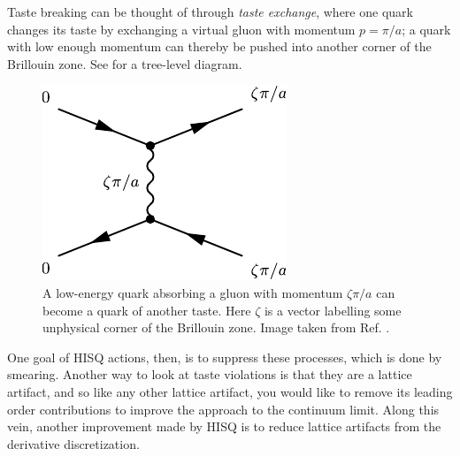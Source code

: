 Taste breaking can be thought of through {\it taste exchange}, where
one quark changes its taste by exchanging a virtual gluon with momentum
$p=\pi/a$; a quark with low enough momentum can thereby be pushed into
another corner of the Brillouin zone. See 
for a tree-level diagram.
\begin{figure}[t]
  \centering
  \includegraphics{figs/treelevel.pdf}
  \caption{A low-energy quark absorbing a gluon with momentum $\zeta\pi/a$
           can become a quark of another taste. Here $\zeta$ is a vector
           labelling some unphysical corner of the Brillouin zone. Image
           taken from Ref. \cite{follana_highly_2007}.
           }
  \label{fig:treeLevelTasteExchange}
\end{figure}
One goal of HISQ actions, then, is to suppress these processes, which is
done by smearing. Another way to look at taste violations is that they
are a lattice artifact, and so like any other lattice artifact, you would
like to remove its leading order contributions to improve the
approach to the continuum limit. Along this vein, another improvement
made by HISQ is to reduce lattice artifacts from the derivative discretization.

